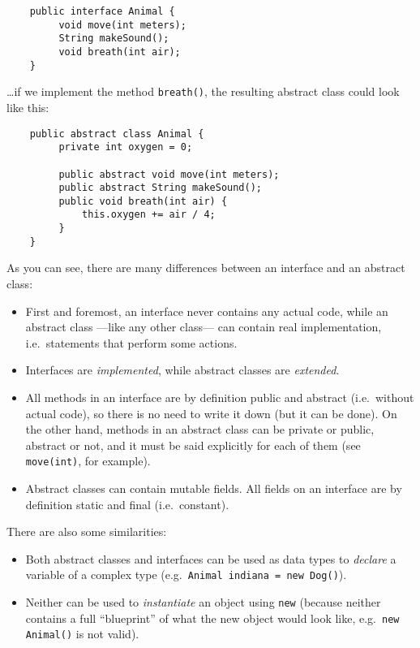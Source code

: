 \begin{verbatim}
    public interface Animal {
         void move(int meters);
         String makeSound();
         void breath(int air);
    }
\end{verbatim}

\ldots if we implement the method \verb+breath()+, the resulting
abstract class could look like this: 

\begin{verbatim}
    public abstract class Animal {
         private int oxygen = 0;

         public abstract void move(int meters);
         public abstract String makeSound();
         public void breath(int air) {
             this.oxygen += air / 4;
         }
    }        
\end{verbatim}

As you can see, there are many differences between an interface and an
abstract class: 

\begin{itemize}
\item First and foremost, an interface never contains any actual code,
  while an abstract class ---like any other class--- can contain real
  implementation, i.e.~statements that perform some actions.
\item Interfaces are \emph{implemented}, while abstract classes are
  \emph{extended}.
\item All methods in an interface are by definition public and
  abstract (i.e.~without actual code), so there is no need to write it
  down (but it can be done). On the other hand, methods in an abstract
  class can be private or public, abstract or not, and it must be said
  explicitly for each of them (see \verb+move(int)+, for example).
\item Abstract classes can contain mutable fields. All fields on an
  interface are by definition static and final (i.e.~constant).
\end{itemize}

There are also some similarities: 

\begin{itemize}
\item Both abstract classes and interfaces can be used as data
  types to \emph{declare} a variable of a complex type 
  (e.g.~\verb+Animal indiana = new Dog()+).
\item Neither can be used to \emph{instantiate} an object using \verb+new+
  (because neither contains a full ``blueprint'' of what the new
  object would look like, e.g.~\verb+new Animal()+ is not valid). 
\end{itemize}

